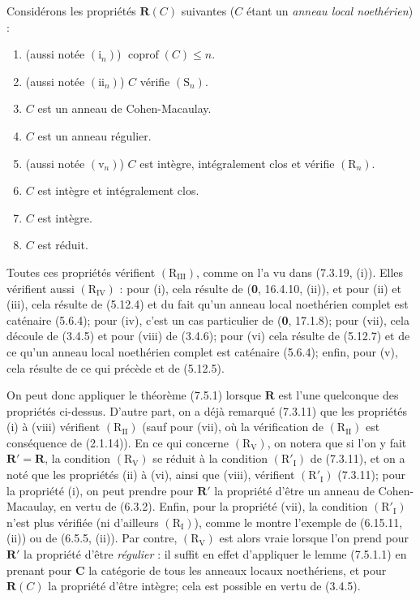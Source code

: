 \begin{examples}[7.5.3]
\label{IV.2.s7.5.3-fr}
Considérons les propriétés $\boldsymbol R(C)$ suivantes ($C$ étant un \emph{anneau
local noethérien}) :
\begin{enumerate}
\item[(i)] (aussi notée $(\mathrm i_n)$) $\operatorname{coprof}(C)\leq n$.
\item[(ii)] (aussi notée $(\mathrm{ii}_n)$) $C$ vérifie $(\mathrm S_n)$.
\item[(iii)] $C$ est un anneau de Cohen-Macaulay.
\item[(iv)] $C$ est un anneau régulier.
\item[(v)] (aussi notée $(\mathrm v_n)$) $C$ est intègre, intégralement
clos et vérifie $(\mathrm R_n)$.
\item[(vi)] $C$ est intègre et intégralement clos.
\item[(vii)] $C$ est intègre.
\item[(viii)] $C$ est réduit.
\end{enumerate}

Toutes ces propriétés vérifient $(\mathrm R_{\mathrm{III}})$, comme on l'a vu
dans (7.3.19, (i)). Elles vérifient aussi $(\mathrm R_{\mathrm{IV}})$ : pour
(i), cela résulte de (\textbf{0}, 16.4.10, (ii)), et pour (ii) et (iii), cela résulte de
(5.12.4) et du fait qu'un anneau local noethérien complet est caténaire
(5.6.4); pour (iv), c'est un cas particulier de (\textbf{0}, 17.1.8); pour (vii), cela
découle de (3.4.5) et pour (viii) de (3.4.6); pour (vi) cela résulte de
(5.12.7) et de ce qu'un anneau local noethérien complet est caténaire (5.6.4);
enfin, pour (v), cela résulte de ce qui précède et de (5.12.5).

On peut donc appliquer le théorème (7.5.1) lorsque $\boldsymbol R$ est l'une
quelconque des propriétés ci-dessus. D'autre part, on a déjà remarqué (7.3.11)
que les propriétés (i) à (viii) vérifient $(\mathrm R_{\mathrm{II}})$ (sauf
pour (vii), où la vérification de $(\mathrm R_{\mathrm{II}})$ est conséquence
de (2.1.14)). En ce qui concerne $(\mathrm R_{\mathrm V})$, on notera que si
l'on y fait $\boldsymbol R'=\boldsymbol R$, la condition
$(\mathrm R_{\mathrm V})$ se réduit à la condition
$(\mathrm R'_{\mathrm I})$ de (7.3.11), et on a noté que les propriétés (ii) à
(vi), ainsi que (viii), vérifient $(\mathrm R'_{\mathrm I})$ (7.3.11); pour la
propriété (i), on peut prendre pour $\boldsymbol R'$ la propriété d'être un
anneau de Cohen-Macaulay, en vertu de (6.3.2). Enfin, pour la propriété (vii),
la condition $(\mathrm R'_{\mathrm I})$ n'est plus vérifiée (ni d'ailleurs
$(\mathrm R_{\mathrm I})$), comme le montre l'exemple de (6.15.11, (ii)) ou de
(6.5.5, (ii)). Par contre, $(\mathrm R_{\mathrm V})$ est alors vraie lorsque
l'on prend pour $\boldsymbol R'$ la propriété d'être \emph{régulier} : il suffit en
effet d'appliquer le lemme (7.5.1.1) en prenant pour $\boldsymbol{C}$ la catégorie
de tous les anneaux locaux noethériens, et pour $\boldsymbol R(C)$ la propriété
d'être intègre; cela est possible en vertu de (3.4.5).


\end{examples}
